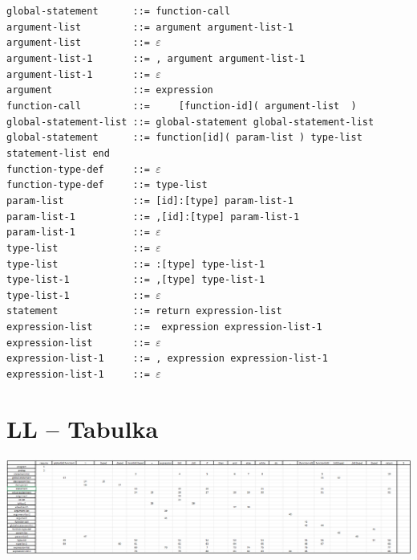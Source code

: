 \documentclass[11pt]{article}
\begin{document}
        \verb|global-statement      ::= function-call| \\
        \verb|argument-list         ::= argument argument-list-1| \\
        \verb|argument-list         ::= |$\varepsilon$ \\ 
        \verb|argument-list-1       ::= , argument argument-list-1| \\
        \verb|argument-list-1       ::= |$\varepsilon$ \\
        \verb|argument              ::= expression| \\
        \verb|function-call         ::=     [function-id]( argument-list  )| \\
        \verb|global-statement-list ::= global-statement global-statement-list| \\
        \verb|global-statement      ::= function[id]( param-list ) type-list statement-list end| \\
        \verb|function-type-def     ::= |$\varepsilon$ \\
        \verb|function-type-def     ::= type-list| \\
        \verb|param-list            ::= [id]:[type] param-list-1| \\
        \verb|param-list-1          ::= ,[id]:[type] param-list-1| \\
        \verb|param-list-1          ::= |$\varepsilon$ \\
        \verb|type-list             ::= |$\varepsilon$ \\
        \verb|type-list             ::= :[type] type-list-1| \\
        \verb|type-list-1           ::= ,[type] type-list-1| \\
        \verb|type-list-1           ::= |$\varepsilon$ \\
        \verb|statement             ::= return expression-list| \\
        \verb|expression-list       ::=  expression expression-list-1| \\
        \verb|expression-list       ::= |$\varepsilon$ \\
        \verb|expression-list-1     ::= , expression expression-list-1| \\
        \verb|expression-list-1     ::= |$\varepsilon$ \pagebreak
    
    \section{LL -- Tabulka}
        \includegraphics[width=1\linewidth]{lltable.png}
\end{document}
